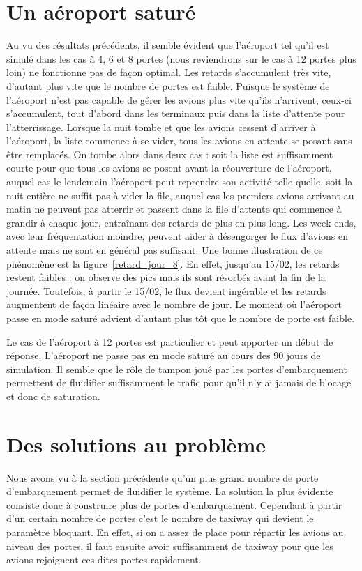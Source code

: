
\section{Un aéroport saturé}
Au vu des résultats précédents, il semble évident que l'aéroport tel qu'il est simulé dans les cas à 4, 6 et 8 portes (nous reviendrons sur le cas à 12 portes plus loin) ne fonctionne pas de façon optimal.
Les retards s'accumulent très vite, d'autant plus vite que le nombre de portes est faible. Puisque le système de l'aéroport n'est pas capable de gérer les avions plus vite qu'ils n'arrivent, ceux-ci s'accumulent, tout d'abord dans les terminaux puis dans la liste d'attente pour l'atterrissage.
Lorsque la nuit tombe et que les avions cessent d'arriver à l'aéroport, la liste commence à se vider, tous les avions en attente se posant sans être remplacés. On tombe alors dans deux cas : soit la liste est suffisamment courte pour que tous les avions se posent avant la réouverture de l'aéroport, auquel cas le lendemain l'aéroport peut reprendre son activité telle quelle, soit la nuit entière ne suffit pas à vider la file, auquel cas les premiers avions arrivant au matin ne peuvent pas atterrir et passent dans la file d'attente qui commence à grandir à chaque jour, entraînant des retards de plus en plus long. Les week-ends, avec leur fréquentation moindre, peuvent aider à désengorger le flux d'avions en attente mais ne sont en général pas suffisant.
Une bonne illustration de ce phénomène est la figure~\ref{retard_jour_8}. En effet, jusqu'au 15/02, les retards restent faibles : on observe des pics mais ils sont résorbés avant la fin de la journée. Toutefois, à partir le 15/02, le flux devient ingérable et les retards augmentent de façon linéaire avec le nombre de jour.
Le moment où l'aéroport passe en mode saturé advient d'autant plus tôt que le nombre de porte est faible.

Le cas de l'aéroport à 12 portes est particulier et peut apporter un début de réponse. L'aéroport ne passe pas en mode saturé au cours des 90 jours de simulation. Il semble que le rôle de tampon joué par les portes d'embarquement permettent de fluidifier suffisamment le trafic pour qu'il n'y ai jamais de blocage et donc de saturation.
\vspace{1cm}
\section{Des solutions au problème}
Nous avons vu à la section précédente qu'un plus grand nombre de porte d'embarquement permet de fluidifier le système. La solution la plus évidente consiste donc à construire plus de portes d'embarquement. Cependant à partir d'un certain nombre de portes c'est le nombre de taxiway qui devient le paramètre bloquant. En effet, si on a assez de place pour répartir les avions au niveau des portes, il faut ensuite avoir suffisamment de taxiway pour que les avions rejoignent ces dites portes rapidement.

